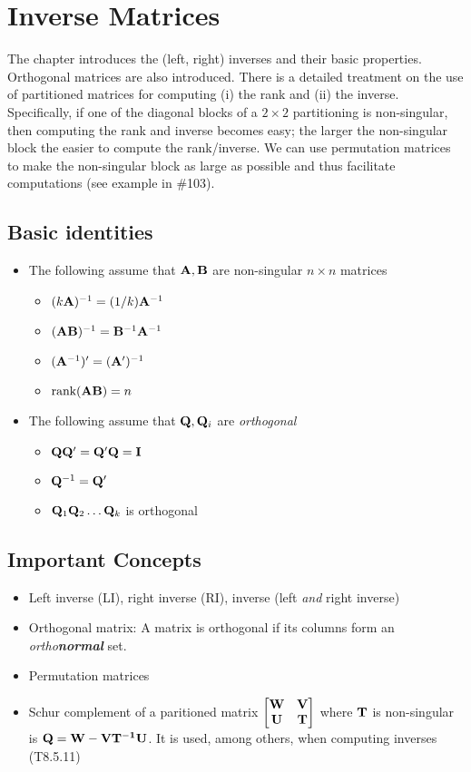 \documentclass[a4paper, oneside]{book}
\begin{document}
\chapter{Inverse Matrices}
The chapter introduces the (left, right) inverses and their basic properties. Orthogonal matrices are also introduced. There is a detailed treatment on the use of partitioned matrices for computing (i) the rank and (ii) the inverse. Specifically, if one of the diagonal blocks of a $2\times 2$ partitioning is non-singular, then computing the rank and inverse becomes easy; the larger the non-singular block the easier to compute the rank/inverse. We can use permutation matrices to make the non-singular block as large as possible and thus facilitate computations (see example in \#103).


\section*{Basic identities}
\begin{itemize}
\item The following assume that $\mathbf{A,B}$ are non-singular $n\times n$ matrices
	\begin{itemize}
	\item $(k\mathbf A)^{-1}=(1/k)\mathbf A^{-1}$
	\item $(\mathbf{AB})^{-1}=\mathbf{B}^{-1} \mathbf{A}^{-1}$ 
	\item $(\mathbf A^{-1})' = (\mathbf A')^{-1}$
	\item $\text{rank}(\mathbf{AB}) = n$
	\end{itemize}
\item The following assume that $\mathbf Q, \mathbf Q_i$ are \textit{orthogonal}
	\begin{itemize}
	\item $\mathbf{Q}\mathbf{Q}'=\mathbf{Q}'\mathbf{Q}=\mathbf I$
	\item $\mathbf{Q}^{-1}=\mathbf{Q}'$
	\item $\mathbf{Q}_1\mathbf{Q}_2\hdots\mathbf{Q}_k$ is orthogonal
	\end{itemize}
\end{itemize}

\section*{Important Concepts}
\begin{itemize}
\item Left inverse (LI), right inverse (RI), inverse (\aka left \textit{and} right inverse)
\item Orthogonal matrix: A matrix is orthogonal if its columns form an \textit{ortho\textbf{normal}} set.
\item Permutation matrices
\item Schur complement of a paritioned matrix $\begin{bmatrix}
\mathbf W & \mathbf V \\ \mathbf U & \mathbf T
\end{bmatrix}$ where $\mathbf T$ is non-singular is $\mathbf{Q=W-VT^{-1}U}$. It is used, among others, when computing inverses (T8.5.11)
\end{itemize}
\end{document}
